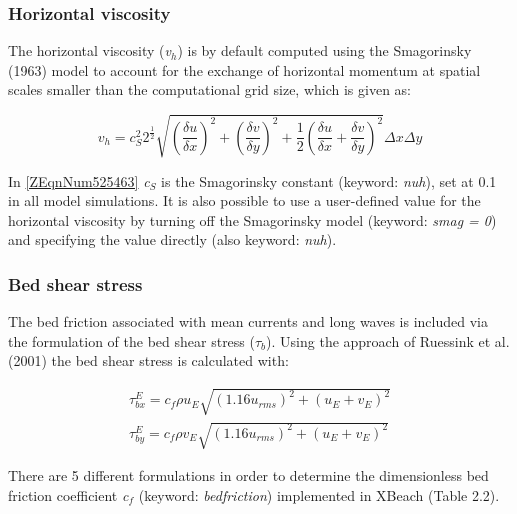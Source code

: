 \documentclass{article}
\begin{document}
\subsubsection{ Horizontal viscosity }

\noindent The horizontal viscosity (\textit{v${}_{h}$}) is by default computed using the Smagorinsky (1963) model to account for the exchange of horizontal momentum at spatial scales smaller than the computational grid size, which is given as:

\noindent 
\begin{equation} \label{ZEqnNum525463} 
v_{h} =c_{S} ^{2} 2^{\frac{1}{2} } \sqrt{\left(\frac{\delta u}{\delta x} \right)^{2} +\left(\frac{\delta v}{\delta y} \right)^{2} +\frac{1}{2} \left(\frac{\delta u}{\delta x} +\frac{\delta v}{\delta y} \right)^{2} } \Delta x\Delta y 
\end{equation} 


\noindent In \eqref{ZEqnNum525463} \textit{c${}_{S}$} is the Smagorinsky constant (keyword: \textit{nuh}), set at 0.1 in all model simulations. It is also possible to use a user-defined value for the horizontal viscosity by turning off the Smagorinsky model (keyword: \textit{smag = 0}) and specifying the value directly (also keyword: \textit{nuh}).


\subsubsection{ Bed shear stress}

\noindent The bed friction associated with mean currents and long waves is included via the formulation of the bed shear stress (\textit{$\tau $${}_{b}$}). Using the approach of Ruessink et al. (2001) the bed shear stress is calculated with:

\noindent 
\begin{equation} \label{2.52)} 
\begin{array}{l} {\tau _{bx}^{E} =c_{f} \rho u_{E} \sqrt{\left(1.16u_{rms} \right)^{2} +\left(u_{E} +v_{E} \right)^{2} } } \\ {\tau _{by}^{E} =c_{f} \rho v_{E} \sqrt{\left(1.16u_{rms} \right)^{2} +\left(u_{E} +v_{E} \right)^{2} } } \end{array} 
\end{equation} 


\noindent There are 5 different formulations in order to determine the dimensionless bed friction coefficient \textit{c${}_{f}$} (keyword: \textit{bedfriction}) implemented in XBeach (Table 2.2).
\end{document}
